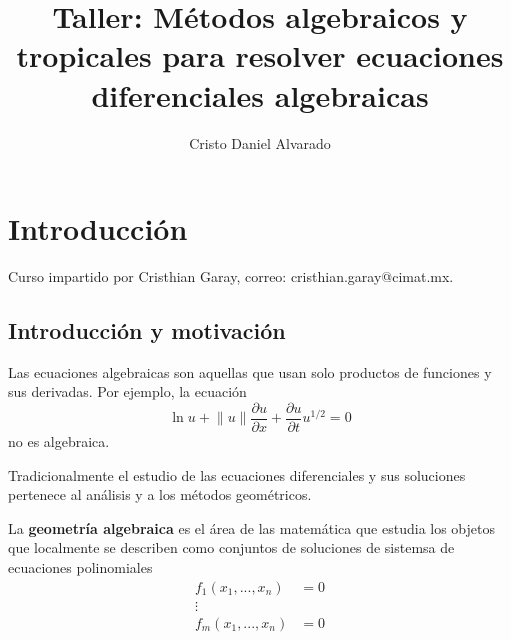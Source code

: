 \documentclass[12pt]{report}
\theoremstyle{largebreak}
\begin{document}
    \setlength{\parskip}{5pt} %
    \setlength{\parindent}{12pt} %
    \title{Taller: Métodos algebraicos y tropicales para resolver ecuaciones diferenciales algebraicas}
    \author{Cristo Daniel Alvarado}
    \maketitle

    \tableofcontents %

    
    \chapter{Introducción}
    
    Curso impartido por Cristhian Garay, correo: cristhian.garay@cimat.mx.

    \section{Introducción y motivación}

    \newcommand{\norm}[1]{\ensuremath{\|#1\|}}

    \begin{obs}
        Las ecuaciones algebraicas son aquellas que usan solo productos de funciones y sus derivadas. Por ejemplo, la ecuación
        \begin{equation*}
            \ln u+\norm{u}\frac{\partial u}{\partial x}+\frac{\partial u}{\partial t}u^{ 1/2}=0
        \end{equation*}
        no es algebraica.
    \end{obs}

    Tradicionalmente el estudio de las ecuaciones diferenciales y sus soluciones pertenece al análisis y a los métodos geométricos.

    \begin{mydef}
        La \textbf{geometría algebraica} es el área de las matemática que estudia los objetos que localmente se describen como conjuntos de soluciones de sistemsa de ecuaciones polinomiales
        \begin{equation*}
            \begin{split}
                f_1(x_1,...,x_n)&=0\\
                \vdots\\
                f_m(x_1,...,x_n)&=0\\
            \end{split}
        \end{equation*}
    \end{mydef}
\end{document}
